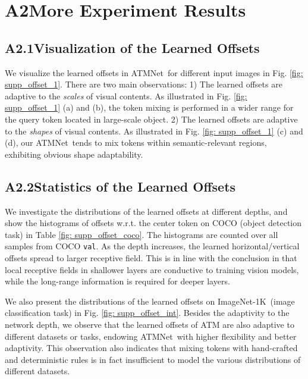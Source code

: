 \documentclass[letterpaper]{article} \usepackage{aaai23v}  \usepackage{times}  \usepackage{helvet}  \usepackage{courier}  \usepackage[hyphens]{url}  \usepackage{graphicx} \urlstyle{rm} \def\UrlFont{\rm}  \usepackage{caption} \frenchspacing  \setlength{\pdfpagewidth}{8.5in}  \setlength{\pdfpageheight}{11in}  \usepackage{algorithm}
\newcommand{\ours}{{ATMNet}}
\newcommand{\imntk}{ImageNet-1K}
\begin{document}
\section*{A2\quad More Experiment Results}


\subsection*{A2.1\quad Visualization of the Learned Offsets}
\label{sec: visu}

We visualize the learned offsets in \ours~for different input images in Fig. \ref{fig: supp_offset_1}. There are two main observations:
1) The learned offsets are adaptive to the \emph{scales} of visual contents. As illustrated in Fig. \ref{fig: supp_offset_1} (a) and (b), the token mixing is performed in a wider range for the query token located in large-scale object. 
2) The learned offsets are adaptive to the \emph{shapes} of visual contents. As illustrated in Fig. \ref{fig: supp_offset_1} (c) and (d), our \ours~tends to mix tokens within semantic-relevant regions, exhibiting obvious shape adaptability.



\subsection*{A2.2\quad Statistics of the Learned Offsets}
\label{sec: stat}
We investigate the distributions of the learned offsets at different depths, and show the histograms of offsets w.r.t. the center token on COCO (object detection task) in Table \ref{fig: supp_offset_coco}. The histograms are counted over all samples from COCO \texttt{val}. 
As the depth increases, the learned horizontal/vertical offsets spread to larger receptive field. This is in line with the conclusion in \cite{raghu2021DoVisionTrans,zhang2021morphmlp} that local receptive fields in shallower layers are conductive to training vision models, while the long-range information is required for deeper layers. 


We also present the distributions of the learned offsets on \imntk~(image classification task) in Fig. \ref{fig: supp_offset_int}. Besides the adaptivity to the network depth, we observe that the learned offsets of ATM are also adaptive to different datasets or tasks, endowing \ours~with higher flexibility and better adaptivity. This observation also indicates that mixing tokens with hand-crafted and deterministic rules \cite{chen2022cyclemlp,zhang2021morphmlp,hou2021visionvip} is in fact insufficient to model the various distributions of different datasets. 
\end{document}
